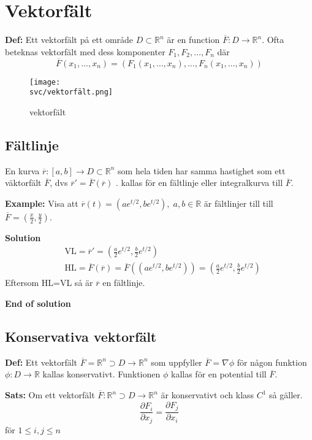 \section{Vektorfält}
\textbf{Def:} Ett vektorfält på ett område $D\subset\mathbb{R}^n$
är en function $\overline{F}:D\to\mathbb{R}^n$. Ofta beteknas vektorfält
med dess komponenter $F_1,F_2,\ldots,F_n$ där
\begin{equation*}
    \overline{F}(x_1,\ldots,x_n) = \left(F_1(x_1,\ldots,x_n),\ldots,F_n(x_1,\ldots,x_n)\right)
\end{equation*}

\begin{figure}[H]
    \centering
    \texttt{[image: \\svc/vektorfält.png]}
    \caption{vektorfält}
\end{figure}


\subsection{Fältlinje}
En kurva $\overline{r}:[a,b]\to D\subset\mathbb{R}^n$ som hela tiden har samma
hastighet som ett väktorfält $\overline{F}$, dvs $\overline{r}'=\overline{F}(\overline{r})$ .
kallas för en fältlinje eller integralkurva till $\overline{F}$.

\textbf{Example:}
Visa att $\overline{r}(t) = (ae^{t/2},be^{t/2}),\;a,b\in\mathbb{R}$ är fältlinjer
till till $\overline{F} = \left(\frac{x}{2},\frac{y}{2}\right)$.

\textbf{Solution}
\begin{align*}
    &\text{VL} = \overline{r}' = \left(\frac{a}{2}e^{t/2}, \frac{b}{2}e^{t/2}\right) \\
    &\text{HL} = \overline{F}(\overline{r}) = \overline{F}((ae^{t/2},be^{t/2})) = \left(\frac{a}{2}e^{t/2}, \frac{b}{2}e^{t/2}\right)
\end{align*}
Eftersom HL=VL så är $\overline{r}$ en fältlinje.

\textbf{End of solution}


\subsection{Konservativa vektorfält}
\textbf{Def:} Ett vektorfält $\overline{F}=\mathbb{R}^n\supset D\to\mathbb{R}^n$
som uppfyller $\overline{F}=\nabla\phi$ för någon funktion $\phi:D\to\mathbb{R}$
kallas konservativt. Funktionen $\phi$ kallas för en potential till $\overline{F}$.

\textbf{Sats:} Om ett vektorfält $\overline{F}: \mathbb{R}^n\supset D\to\mathbb{R}^n$
är konservativt och klass $C^1$ så gäller.
\begin{equation*}
    \frac{\partial F_i}{\partial x_j}
    = \frac{\partial F_j}{\partial x_i}
\end{equation*}
för $1\leq i,j \leq n$

